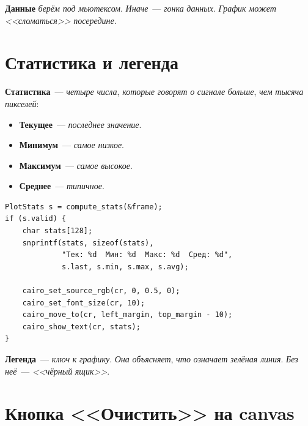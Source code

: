 \begin{warnbox}
\textbf{Данные} \emph{берём} \emph{под} \emph{мьютексом}.
\emph{Иначе}~--- \emph{гонка} \emph{данных}. \emph{График}
\emph{может} \emph{<<сломаться>>} \emph{посередине}.
\end{warnbox}

\section{Статистика и легенда}
\label{sec:render-stats}

\textbf{Статистика}~--- \emph{четыре} \emph{числа}, \emph{которые}
\emph{говорят} \emph{о} \emph{сигнале} \emph{больше}, \emph{чем}
\emph{тысяча} \emph{пикселей}:
\begin{itemize}
    \item \textbf{Текущее}~--- \emph{последнее} \emph{значение}.
    \item \textbf{Минимум}~--- \emph{самое} \emph{низкое}.
    \item \textbf{Максимум}~--- \emph{самое} \emph{высокое}.
    \item \textbf{Среднее}~--- \emph{типичное}.
\end{itemize}

\begin{listing}[htbp]
\begin{verbatim}
PlotStats s = compute_stats(&frame);
if (s.valid) {
    char stats[128];
    snprintf(stats, sizeof(stats),
             "Тек: %d  Мин: %d  Макс: %d  Сред: %d",
             s.last, s.min, s.max, s.avg);

    cairo_set_source_rgb(cr, 0, 0.5, 0);
    cairo_set_font_size(cr, 10);
    cairo_move_to(cr, left_margin, top_margin - 10);
    cairo_show_text(cr, stats);
}
\end{verbatim}
\caption{Статистика}
\label{lst:render-stats}
\end{listing}

\begin{ideabox}
\textbf{Легенда}~--- \emph{ключ} \emph{к} \emph{графику}. \emph{Она}
\emph{объясняет}, \emph{что} \emph{означает} \emph{зелёная}
\emph{линия}. \emph{Без} \emph{неё}~--- \emph{<<чёрный} \emph{ящик>>}.
\end{ideabox}

\section{Кнопка <<Очистить>> на canvas}
\label{sec:render-button}

